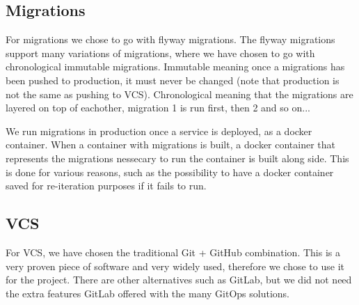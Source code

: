 \subsection{Migrations}
For migrations we chose to go with flyway migrations.
The flyway migrations support many variations of migrations, where we have chosen to go with chronological immutable migrations.
Immutable meaning once a migrations has been pushed to production, it must never be changed (note that production is not the same as pushing to VCS).
Chronological meaning that the migrations are layered on top of eachother, migration 1 is run first, then 2 and so on...

We run migrations in production once a service is deployed, as a docker container.
When a container with migrations is built, a docker container that represents the migrations nessecary to run the container is built along side.
This is done for various reasons, such as the possibility to have a docker container saved for re-iteration purposes if it fails to run.

\subsection{VCS}
For VCS, we have chosen the traditional Git + GitHub combination.
This is a very proven piece of software and very widely used, therefore we chose to use it for the project.
There are other alternatives such as GitLab, but we did not need the extra features GitLab offered with the many GitOps solutions.

